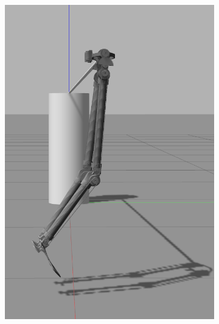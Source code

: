 \begin{figure}[h]
\begin{subfigure}{.19\textwidth}
    \includegraphics[width=\linewidth]{figures/gazebo_jumping_4.png}
  \end{subfigure}
  \begin{subfigure}{.19\textwidth}

\end{subfigure}
\end{figure}
